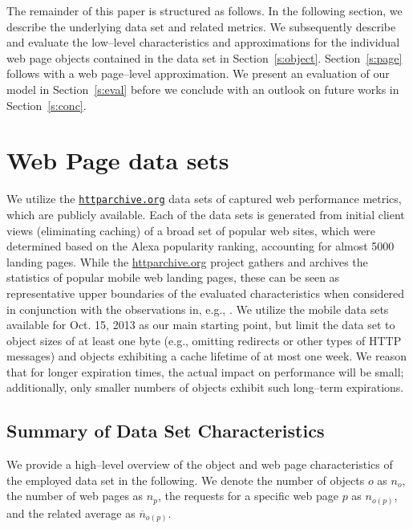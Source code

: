 \documentclass[letterpaper,conference]{IEEEtran}
\begin{document}
The remainder of this paper is structured as follows.
In the following section, we describe the underlying data set and related metrics. 
We subsequently describe and evaluate the low--level characteristics and approximations for the individual web page objects contained in the data set in Section~\ref{s:object}.
Section~\ref{s:page} follows with a web page--level approximation.
We present an evaluation of our model in Section~\ref{s:eval} before we conclude with an outlook on future works in Section~\ref{s:conc}.



\section{Web Page data sets}
\label{s:data}
We utilize the \texttt{\url{httparchive.org}} data sets of captured web performance metrics, which are publicly available. 
Each of the data sets is generated from initial client views (eliminating caching) of a broad set of popular web sites, which were determined based on the Alexa popularity ranking, accounting for almost 5000 landing pages. 
While the \url{httparchive.org} project gathers and archives the statistics of popular mobile web landing pages, these can be seen as representative upper boundaries of the evaluated characteristics when considered in conjunction with the observations in, e.g., \cite{BuMaSe13}.
We utilize the mobile data sets available for Oct. 15, 2013 as our main starting point, but limit the data set to object sizes of at least one byte (e.g., omitting redirects or other types of HTTP messages) and objects exhibiting a cache lifetime of at most one week.
We reason that for longer expiration times, the actual impact on performance will be small; additionally, only smaller numbers of objects exhibit such long--term expirations.


\subsection{Summary of Data Set Characteristics} 
We provide a high--level overview of the object and web page characteristics of the employed data set in the following.
We denote the number of objects $o$ as $n_o$, the number of web pages as $n_p$, the requests for a specific web page $p$ as $n_{o(p)}$, and the related average as $\overline{n}_{o(p)}$. 
\end{document}
